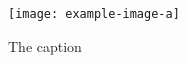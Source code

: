 \documentclass{article}
\begin{document}
    \begin{multicols}{2}
        \lipsum[1]
        \lipsum[1]
        \begin{figure*}[htp]
            \texttt{[image: example-image-a]}
            \caption{The caption}
        \end{figure*}
        \lipsum[2]
        \lipsum[2]
        \lipsum[2]
        \lipsum[2]
    \end{multicols}
\end{document}
